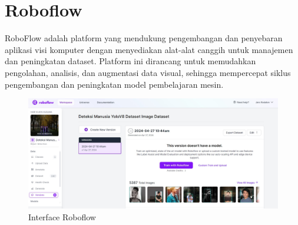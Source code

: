 \section{Roboflow}
RoboFlow adalah platform yang mendukung pengembangan dan penyebaran aplikasi visi komputer dengan menyediakan alat-alat canggih untuk manajemen dan peningkatan dataset. Platform ini dirancang untuk memudahkan pengolahan, analisis, dan augmentasi data visual, sehingga mempercepat siklus pengembangan dan peningkatan model pembelajaran mesin.

\begin{figure}[H]
  \centering

  \includegraphics[scale=0.3]{gambar/roboflow.jpg}

  \caption{Interface Roboflow}
  \label{fig:roboflow}
\end{figure}


